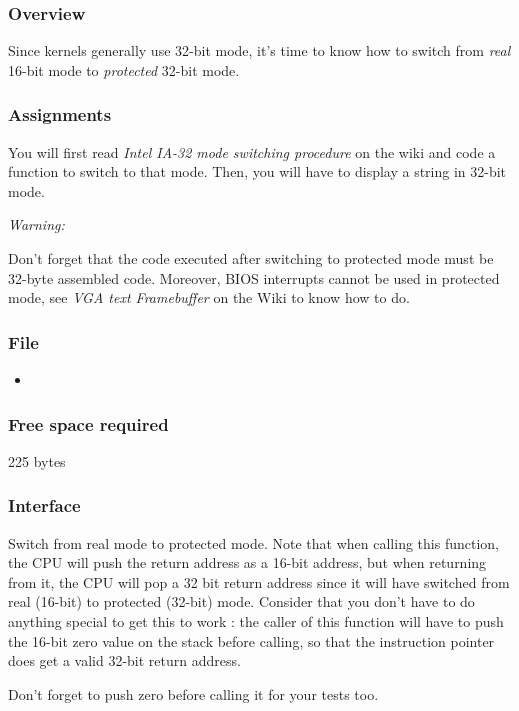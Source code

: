 \subsubsection*{Overview}
Since kernels generally use 32-bit mode, it's time to know how to switch from
\emph{real} 16-bit mode to \emph{protected} 32-bit mode.

\subsubsection*{Assignments}
You will first read \emph{Intel IA-32 mode switching procedure} on the wiki
and code a function to switch to that mode. Then, you will have to display a
string in 32-bit mode.

{\em Warning:}

Don't forget that the code executed after switching to protected mode must be
32-byte assembled code. Moreover, BIOS interrupts cannot be used in protected
mode, see \emph{VGA text Framebuffer} on the Wiki to know how to do.

\subsubsection*{File}
\begin{itemize}
  \item {}
\end{itemize}

\subsubsection*{Free space required}
225 bytes

\subsubsection*{Interface}
{
  Switch from real mode to protected mode.
  Note that when calling this function, the CPU will push the return address
  as a 16-bit address, but when returning from it, the CPU will pop a 32 bit
  return address since it will have switched from real (16-bit) to protected
  (32-bit) mode. Consider that you don't have to do anything special to get
  this to work : the caller of this function will have to push the 16-bit zero
  value on the stack before calling, so that the instruction pointer does get
  a valid 32-bit return address.

  Don't forget to push zero before calling it for your tests too.
}


